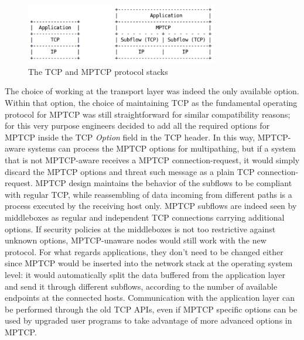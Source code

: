 \begin{figure}[!htb]
\centering
\includegraphics[width=0.75\textwidth]{images/stack}
\caption{The TCP and MPTCP protocol stacks}
\label{fig:stack}
\end{figure}

The choice of working at the transport layer was indeed the only available option. Within that option, the choice of maintaining TCP as the fundamental operating protocol for MPTCP was still straightforward for similar compatibility reasons; for this very purpose engineers decided to add all the required options for MPTCP inside the TCP \textit{Option} field in the TCP header. In this way, MPTCP-aware systems can process the MPTCP options for multipathing, but if a system that is not MPTCP-aware receives a MPTCP connection-request, it would simply discard the MPTCP options and threat such message as a plain TCP connection-request. 
MPTCP design maintains the behavior of the subflows to be compliant with regular TCP, while reassembling of data incoming from different paths is a process executed by the receiving host only. MPTCP subflows are indeed seen by middleboxes as regular and independent TCP connections carrying additional options. If security policies at the middleboxes is not too restrictive against unknown options, MPTCP-unaware nodes would still work with the new protocol.
For what regards applications, they don't need to be changed either since MPTCP would be inserted into the network stack at the operating system level: it would automatically split the data buffered from the application layer and send it through different subflows, according to the number of available endpoints at the connected hosts. Communication with the application layer can be performed through the old TCP APIs, even if MPTCP specific options can be used by upgraded user programs to take advantage of more advanced options in MPTCP.

